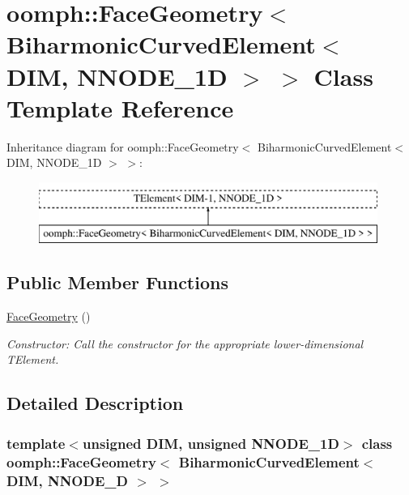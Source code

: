 \hypertarget{classoomph_1_1FaceGeometry_3_01BiharmonicCurvedElement_3_01DIM_00_01NNODE__1D_01_4_01_4}{}\section{oomph\+:\+:Face\+Geometry$<$ Biharmonic\+Curved\+Element$<$ D\+IM, N\+N\+O\+D\+E\+\_\+1D $>$ $>$ Class Template Reference}
\label{classoomph_1_1FaceGeometry_3_01BiharmonicCurvedElement_3_01DIM_00_01NNODE__1D_01_4_01_4}
Inheritance diagram for oomph\+:\+:Face\+Geometry$<$ Biharmonic\+Curved\+Element$<$ D\+IM, N\+N\+O\+D\+E\+\_\+1D $>$ $>$\+:\begin{figure}[H]
\begin{center}
\leavevmode
\includegraphics[height=2.000000cm]{classoomph_1_1FaceGeometry_3_01BiharmonicCurvedElement_3_01DIM_00_01NNODE__1D_01_4_01_4}
\end{center}
\end{figure}
\subsection*{Public Member Functions}
\begin{DoxyCompactItemize}
\item 
\hyperlink{classoomph_1_1FaceGeometry_3_01BiharmonicCurvedElement_3_01DIM_00_01NNODE__1D_01_4_01_4_a9b53ebab89d9c273519b2cd4b338a898}{Face\+Geometry} ()
\begin{DoxyCompactList}\small\item\em Constructor\+: Call the constructor for the appropriate lower-\/dimensional T\+Element. \end{DoxyCompactList}\end{DoxyCompactItemize}


\subsection{Detailed Description}
\subsubsection*{template$<$unsigned D\+IM, unsigned N\+N\+O\+D\+E\+\_\+1D$>$\newline
class oomph\+::\+Face\+Geometry$<$ Biharmonic\+Curved\+Element$<$ D\+I\+M, N\+N\+O\+D\+E\+\_\+D $>$ $>$}

